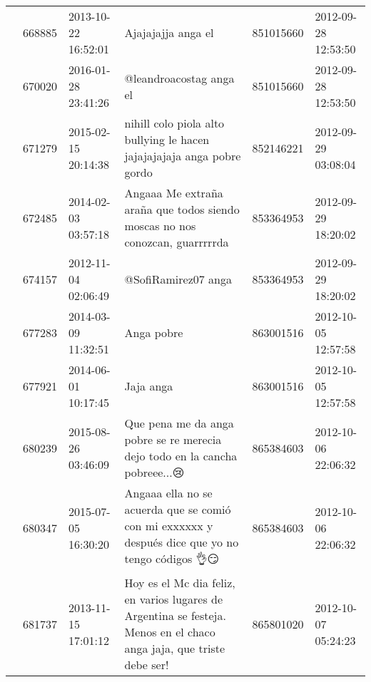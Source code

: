 \begin{tabular}{llllrl}
           & 668885  & 2013-10-22 16:52:01 &                                                                                                                           Ajajajajja anga el &   851015660 & 2012-09-28 12:53:50 \\
           & 670020  & 2016-01-28 23:41:26 &                                                                                                                      @leandroacostag anga el &   851015660 & 2012-09-28 12:53:50 \\
           & 671279  & 2015-02-15 20:14:38 &                                                                       nihill colo piola alto bullying le hacen jajajajajaja anga pobre gordo &   852146221 & 2012-09-29 03:08:04 \\
           & 672485  & 2014-02-03 03:57:18 &                                                                 Angaaa Me extraña araña que todos siendo moscas no nos conozcan,  guarrrrrda &   853364953 & 2012-09-29 18:20:02 \\
           & 674157  & 2012-11-04 02:06:49 &                                                                                                                          @SofiRamirez07 anga &   853364953 & 2012-09-29 18:20:02 \\
           & 677283  & 2014-03-09 11:32:51 &                                                                                                                                   Anga pobre &   863001516 & 2012-10-05 12:57:58 \\
           & 677921  & 2014-06-01 10:17:45 &                                                                                                                                    Jaja anga &   863001516 & 2012-10-05 12:57:58 \\
           & 680239  & 2015-08-26 03:46:09 &                                                                   Que pena me da anga pobre se re merecia dejo todo en la cancha pobreee...😢 &   865384603 & 2012-10-06 22:06:32 \\
           & 680347  & 2015-07-05 16:30:20 &                                              Angaaa ella no se acuerda que se comió con mi exxxxxx y después dice que yo no tengo códigos 👌😏 &   865384603 & 2012-10-06 22:06:32 \\
           & 681737  & 2013-11-15 17:01:12 &                         Hoy es el Mc dia feliz, en varios lugares de Argentina se festeja. Menos en el chaco anga jaja, que triste debe ser! &   865801020 & 2012-10-07 05:24:23 \\

\end{tabular}
